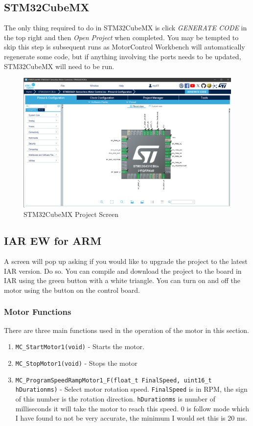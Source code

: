 \documentclass[10pt]{article}
\begin{document}
		\FloatBarrier \subsection{STM32CubeMX}
            The only thing required to do in STM32CubeMX is click \emph{GENERATE CODE} in the top right and then \emph{Open Project} when completed. You may be tempted to skip this step is subsequent runs as MotorControl Workbench will automatically regenerate some code, but if anything involving the ports needs to be updated, STM32CubeMX will need to be run.
            \begin{figure}[H]
                \centerline{\includegraphics[width=\textwidth]{References/CubeMX.png}}
                \caption{STM32CubeMX Project Screen}
                    \end{figure}
		\FloatBarrier \subsection{IAR EW for ARM}
                    A screen will pop up asking if you would like to upgrade the project to the latest IAR version. Do so. You can compile and download the project to the board in IAR using the green button with a white triangle. You can turn on and off the motor using the button on the control board.
			\FloatBarrier \subsubsection{Motor Functions}
                        There are three main functions used in the operation of the motor in this section.
                        \begin{enumerate}
                            \item \texttt{MC\_StartMotor1(void)} - Starts the motor.
                            \item \texttt{MC\_StopMotor1(void)} - Stops the motor
                            \item \texttt{MC\_ProgramSpeedRampMotor1\_F(float\_t FinalSpeed, uint16\_t hDurationms)} - Select motor rotation speed. \texttt{FinalSpeed} is in RPM, the sign of this number is the rotation direction. \texttt{hDurationms} is number of milliseconds it will take the motor to reach this speed. 0 is follow mode which I have found to not be very accurate, the minimum I would set this is 20 ms.
                        \end{enumerate}
\end{document}

